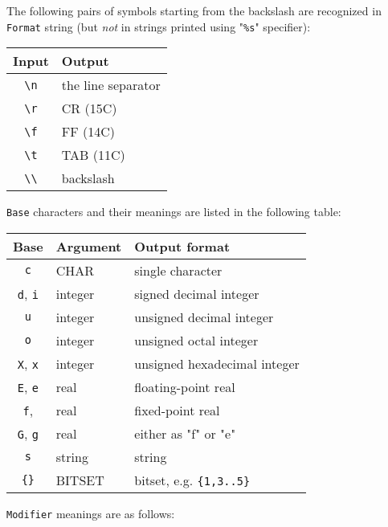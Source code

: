 The following pairs of symbols starting from the backslash
are recognized in \verb'Format' string (but {\em not} in strings
printed using "\verb|%s|" specifier):
\begin{flushleft}
\begin{tabular}{c|l}
\bf Input & \bf Output \\
\hline
\verb'\n' & the line separator \\
\verb'\r' & CR  (15C)          \\
\verb'\f' & FF  (14C)          \\
\verb'\t' & TAB (11C)          \\
\verb'\\' & backslash          \\
\end{tabular}
\end{flushleft}

{\tt Base} characters and their meanings are listed in the following table:

\begin{flushleft}
\begin{tabular}{c|l|l}
\bf Base             & \bf Argument & \bf Output format \\
\hline
\verb"c"             & CHAR    & single character             \\
\verb"d", \verb"i"   & integer & signed decimal integer       \\
\verb"u"             & integer & unsigned decimal integer     \\
\verb"o"             & integer & unsigned octal integer       \\
\verb"X", \verb"x"   & integer & unsigned hexadecimal integer \\
\verb"E", \verb"e"   & real    & floating-point real          \\
\verb"f",            & real    & fixed-point real             \\
\verb"G", \verb"g"   & real    & either as "f" or "e"         \\
\verb"s"             & string  & string                         \\
\verb"{}"            & BITSET  & bitset, e.g. \verb|{1,3..5}| \\
\end{tabular}
\end{flushleft}

{\tt Modifier} meanings are as follows:

